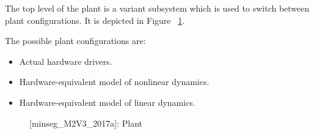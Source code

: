 \documentclass[crop=false,float=true,class=scrreprt]{standalone}
\begin{document}
The top level of the plant is a variant subsystem 
which is used to switch between plant configurations.
It is depicted in Figure~%
\ref{FIG:testPlatform:simulink:plant}.

The possible plant configurations are:

\begin{itemize}[leftmargin=*,itemsep=-1em]

\item Actual hardware drivers.
      
\item Hardware-equivalent model of nonlinear dynamics.
      
\item Hardware-equivalent model of linear dynamics.

\end{itemize}




\vspace*{\fill}
\begin{figure}[H]%
\centering%
%
\caption[{[minseg\_M2V3\_2017a]: Plant}]%
        {{[minseg\_M2V3\_2017a]: Plant%
          \label{FIG:testPlatform:simulink:plant}%
        }}%
\end{figure}
\vspace*{\fill}




\clearpage
\end{document}
